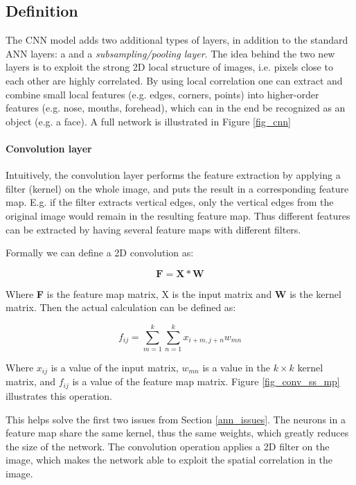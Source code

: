 \subsection{Definition} \hfill \break

The CNN model adds two additional types of layers, in addition to the standard ANN layers: a  and a \textit{subsampling/pooling layer}. The idea behind the two new layers is to exploit the strong 2D local structure of images, i.e. pixels close to each other are highly correlated. By using local correlation one can extract and combine small local features (e.g. edges, corners, points) into higher-order features (e.g. nose, mouths, forehead), which can in the end be recognized as an object (e.g. a face).  A full network is illustrated in Figure \ref{fig_cnn}


\paragraph{Convolution layer}  \hfill \break
Intuitively, the convolution layer performs the feature extraction by applying a filter (kernel) on the whole image, and puts the result in a corresponding feature map. E.g. if the filter extracts vertical edges, only the vertical edges from the original image would remain in the resulting feature map. Thus different features can be extracted by having several feature maps with different filters.  

Formally we can define a 2D convolution as:

\begin{equation}
\mathbf{F} = \mathbf{X*W}
\end{equation}

Where \textbf{F} is the feature map matrix, X is the input matrix and \textbf{W} is the kernel matrix. Then the actual calculation can be defined as:

\begin{equation}
f_{ij} = \sum_{m=1}^{k}\sum_{n=1}^{k} x_{i+m, j+n}w_{mn}
\end{equation}

Where $ x_{ij} $ is a value of the input matrix, $ w_{mn} $ is a value in the $ k \times k $ kernel matrix, and $ f_{ij} $ is a value of the feature map matrix. Figure \ref{fig_conv_ss_mp} illustrates this operation.

This helps solve the first two issues from Section \ref{ann_issues}. The neurons in a feature map share the same kernel, thus the same weights, which greatly reduces the size of the network. The convolution operation applies a 2D filter on the image, which makes the network able to exploit the spatial correlation in the image. 

